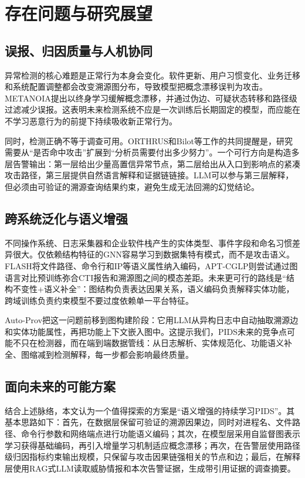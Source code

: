 \chapter{存在问题与研究展望}

\section{误报、归因质量与人机协同}

异常检测的核心难题是正常行为本身会变化。软件更新、用户习惯变化、业务迁移和系统配置调整都会改变溯源图分布，导致模型把概念漂移误判为攻击。METANOIA提出以终身学习缓解概念漂移，并通过伪边、可疑状态转移和路径级过滤减少误报\citep{metanoia2025}。这表明未来检测系统不应是一次训练后长期固定的模型，而应能在不学习恶意行为的前提下持续吸收新正常行为。

同时，检测正确不等于调查可用。ORTHRUS和Bilot等工作的共同提醒是，研究需要从“是否命中攻击”扩展到“分析员需要付出多少努力”。一个可行方向是构造多层告警输出：第一层给出少量高置信异常节点，第二层给出从入口到影响点的紧凑攻击路径，第三层提供自然语言解释和证据链链接。LLM可以参与第三层解释，但必须由可验证的溯源查询结果约束，避免生成无法回溯的幻觉结论。

\section{跨系统泛化与语义增强}

不同操作系统、日志采集器和企业软件栈产生的实体类型、事件字段和命名习惯差异很大。仅依赖结构特征的GNN容易学习到数据集特有模式，而不是攻击语义。FLASH将文件路径、命令行和IP等语义属性纳入编码，APT-CGLP则尝试通过图语言对比预训练弥合CTI报告和溯源图之间的模态差距\citep{flash2024,aptcglp2025}。未来更可行的路线是“结构不变性+语义补全”：图结构负责表达因果关系，语义编码负责解释实体功能，跨域训练负责约束模型不要过度依赖单一平台特征。

Auto-Prov把这一问题前移到图构建阶段：它用LLM从异构日志中自动抽取溯源边和实体功能属性，再把功能上下文嵌入图中\citep{autoprov2026}。这提示我们，PIDS未来的竞争点可能不只在检测器，而在端到端数据管线：从日志解析、实体规范化、功能语义补全、图缩减到检测解释，每一步都会影响最终质量。

\section{面向未来的可能方案}

结合上述脉络，本文认为一个值得探索的方案是“语义增强的持续学习PIDS”。其基本思路如下：首先，在数据层保留可验证的溯源因果边，同时对进程名、文件路径、命令行参数和网络端点进行功能语义编码；其次，在模型层采用自监督图表示学习获得基础编码，再引入增量学习机制适应概念漂移；再次，在告警层使用路径级归因指标约束输出规模，只保留与攻击因果链强相关的节点和边；最后，在解释层使用RAG式LLM读取威胁情报和本次告警证据，生成带引用证据的调查摘要。


